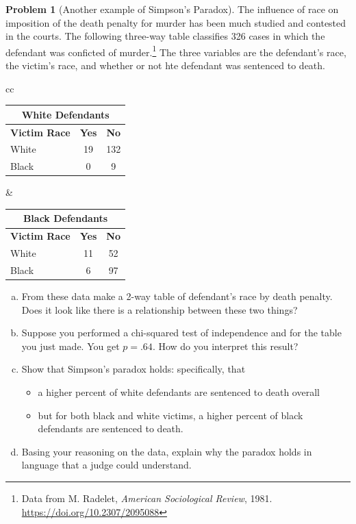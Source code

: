 \documentclass[10pt]{amsart}
\theoremstyle{definition}
\newtheorem{problem}[theorem]{Problem}
\newcommand{\1}[1]{\textbf{1}_{\left[#1\right]}} %
\begin{document}
\newpage
\begin{problem}[Another example of Simpson's Paradox]
  The influence of race on imposition of the death penalty for murder has been
  much studied and contested in the courts. The following three-way table
  classifies 326 cases in which the defendant was conficted of
  murder.\footnote{Data from M. Radelet, \textit{American Sociological Review}, 1981.
    \url{https://doi.org/10.2307/2095088}} The three variables are the
  defendant's race, the victim's race, and whether or not hte defendant was
  sentenced to death.

  \begin{center}
    \begin{tabular}{cc}
      \begin{tabular}{lcc}
        \multicolumn{3}{c}{\textbf{White Defendants}} \\ \hline
        \textbf{Victim Race} & \textbf{Yes} & \textbf{No} \\ \hline
        White & 19 & 132 \\
        Black & 0  & 9   \\ \hline
      \end{tabular}
                            \quad \quad \quad \quad &
                               \begin{tabular}{lcc}
                                 \multicolumn{3}{c}{\textbf{Black Defendants}} \\ \hline
                                 \textbf{Victim Race} & \textbf{Yes} & \textbf{No} \\ \hline
                                 White & 11 & 52  \\
                                 Black & 6  & 97  \\ \hline
                               \end{tabular}
    \end{tabular}
  \end{center}
  \vspace{3em}
  \begin{enumerate}[(a)]
    \setlength{\itemsep}{7em}
    \item From these data make a 2-way table of defendant's race by death
    penalty. Does it look like there is a relationship between these two
    things? 
    \item Suppose you performed a chi-squared test of independence and for
    the table you just made. You get $p=.64$. How do you interpret this
    result?
    \item Show that Simpson's paradox holds: specifically, that
    \begin{itemize}
      \item a higher percent of white defendants are sentenced to death
      overall
      \item but for both black and white victims, a higher percent of black
      defendants are sentenced to death.
    \end{itemize}
    \item Basing your reasoning on the data, explain why the paradox holds
    in language that a judge could understand.
  \end{enumerate}



\end{problem}
\end{document}
